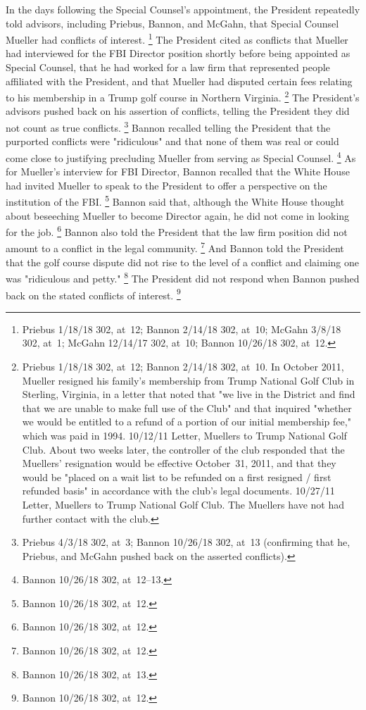 In the days following the Special Counsel's appointment, the President repeatedly told advisors, including Priebus, Bannon, and McGahn, that Special Counsel Mueller had conflicts of interest.%
\footnote{Priebus 1/18/18 302, at~12;
Bannon 2/14/18 302, at~10;
McGahn 3/8/18 302, at~1;
McGahn 12/14/17 302, at~10;
Bannon 10/26/18 302, at~12.}
The President cited as conflicts that Mueller had interviewed for the FBI Director position shortly before being appointed as Special Counsel, that he had worked for a law firm that represented people affiliated with the President, and that Mueller had disputed certain fees relating to his membership in a Trump golf course in Northern Virginia.%
\footnote{Priebus 1/18/18 302, at~12;
Bannon 2/14/18 302, at~10.
In October 2011, Mueller resigned his family's membership from Trump National Golf Club in Sterling, Virginia, in a letter that noted that "we live in the District and find that we are unable to make full use of the Club" and that inquired "whether we would be entitled to a refund of a portion of our initial membership fee," which was paid in 1994.
10/12/11 Letter, Muellers to Trump National Golf Club.
About two weeks later, the controller of the club responded that the Muellers' resignation would be effective October~31, 2011, and that they would be "placed on a wait list to be refunded on a first resigned / first refunded basis" in accordance with the club's legal documents.
10/27/11 Letter, Muellers to Trump National Golf Club.
The Muellers have not had further contact with the club.}
The President's advisors pushed back on his assertion of conflicts, telling the President they did not count as true conflicts.%
\footnote{Priebus 4/3/18 302, at~3;
Bannon 10/26/18 302, at~13 (confirming that he, Priebus, and McGahn pushed back on the asserted conflicts).}
Bannon recalled telling the President that the purported conflicts were "ridiculous" and that none of them was real or could come close to justifying precluding Mueller from serving as Special Counsel.%
\footnote{Bannon 10/26/18 302, at~12--13.}
As for Mueller's interview for FBI Director, Bannon recalled that the White House had invited Mueller to speak to the President to offer a perspective on the institution of the FBI\null.%
\footnote{Bannon 10/26/18 302, at~12.}
Bannon said that, although the White House thought about beseeching Mueller to become Director again, he did not come in looking for the job.%
\footnote{Bannon 10/26/18 302, at~12.}
Bannon also told the President that the law firm position did not amount to a conflict in the legal community.%
\footnote{Bannon 10/26/18 302, at~12.}
And Bannon told the President that the golf course dispute did not rise to the level of a conflict and claiming one was "ridiculous and petty."%
\footnote{Bannon 10/26/18 302, at~13.}
The President did not respond when Bannon pushed back on the stated conflicts of interest.%
\footnote{Bannon 10/26/18 302, at~12.}

